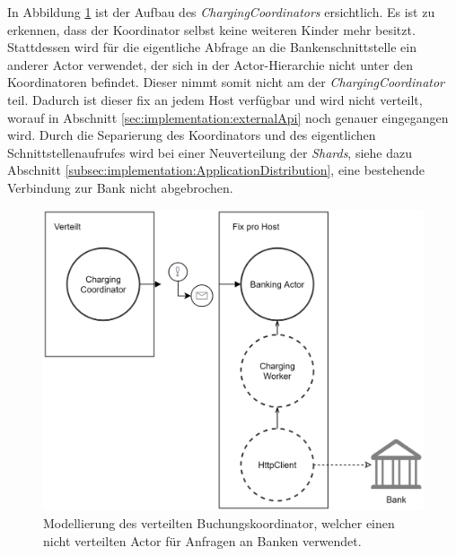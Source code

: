 In Abbildung \ref{fig:implementation:ChargingCoordinatorSample} ist der Aufbau des \textit{ChargingCoordinators} ersichtlich. Es ist zu erkennen, dass der Koordinator selbst keine weiteren Kinder mehr besitzt. Stattdessen wird für die eigentliche Abfrage an die Bankenschnittstelle ein anderer Actor verwendet, der sich in der Actor-Hierarchie nicht unter den Koordinatoren befindet. Dieser nimmt somit nicht am  der \textit{ChargingCoordinator} teil. Dadurch ist dieser fix an jedem Host verfügbar und wird nicht verteilt, worauf in Abschnitt \ref{sec:implementation:externalApi} noch genauer eingegangen wird. Durch die Separierung des Koordinators und des eigentlichen Schnittstellenaufrufes wird bei einer Neuverteilung der \textit{Shards}, siehe dazu Abschnitt \ref{subsec:implementation:ApplicationDistribution}, eine bestehende Verbindung zur Bank nicht abgebrochen. 
\begin{figure}
  \centering
  \includegraphics[width=0.65\linewidth]{gfx/implementation/ChargingCoordinatorSample}
  \caption{Modellierung des verteilten Buchungskoordinator, welcher einen nicht verteilten Actor für Anfragen an Banken verwendet.}
  \label{fig:implementation:ChargingCoordinatorSample}
\end{figure}



